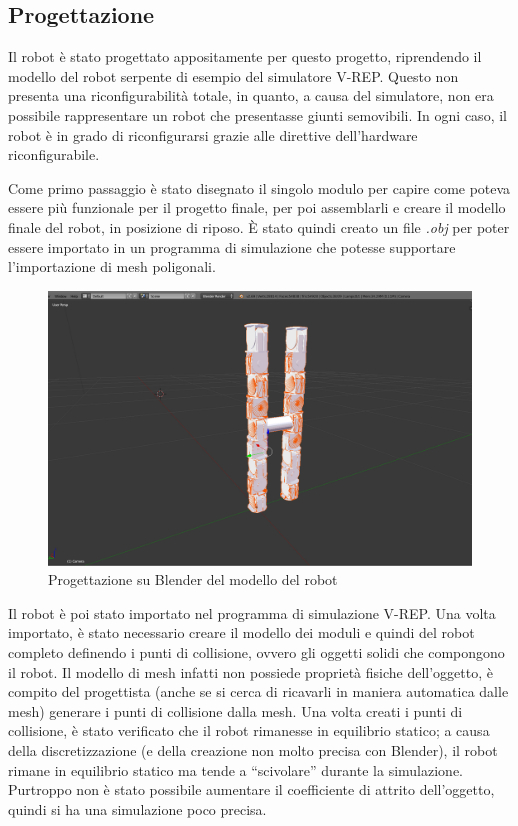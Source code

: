 \documentclass[a4paper,titlepage]{book}
\begin{document}
\subsection{Progettazione}

Il robot è stato progettato appositamente per questo progetto, riprendendo il modello del robot serpente di esempio del simulatore V-REP. Questo non presenta una riconfigurabilità totale, in quanto, a causa del simulatore, non era possibile rappresentare un robot che presentasse giunti semovibili. In ogni caso, il robot è in grado di riconfigurarsi grazie alle direttive dell'hardware riconfigurabile.

Come primo passaggio è stato disegnato il singolo modulo per capire come poteva essere più funzionale per il progetto finale, per poi assemblarli e creare il modello finale del robot, in posizione di riposo. È stato quindi creato un file \textit{.obj} per poter essere importato in un programma di simulazione che potesse supportare l'importazione di mesh poligonali.

\begin{figure}[htbp]
\centering
\includegraphics[scale=0.2]{screen_blender.png}
\caption{Progettazione su Blender del modello del robot}\label{fig:9}
\end{figure}

Il robot è poi stato importato nel programma di simulazione V-REP. Una volta importato, è stato necessario creare il modello dei moduli e quindi del robot completo definendo i punti di collisione, ovvero gli oggetti solidi che compongono il robot. Il modello di mesh infatti non possiede proprietà fisiche dell'oggetto, è compito del progettista (anche se si cerca di ricavarli in maniera automatica dalle mesh) generare i punti di collisione dalla mesh.
Una volta creati i punti di collisione, è stato verificato che il robot rimanesse in equilibrio statico; a causa della discretizzazione (e della creazione non molto precisa con Blender), il robot rimane in equilibrio statico ma tende a ``scivolare'' durante la simulazione. Purtroppo non è stato possibile aumentare il coefficiente di attrito dell'oggetto, quindi si ha una simulazione poco precisa.
\end{document}
